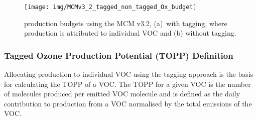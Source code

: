 \begin{figure}
    \centering
    \texttt{[image: img/MCMv3\_2\_tagged\_non\_tagged\_Ox\_budget]}
    \vspace{2mm}
    \caption{ production budgets using the MCM v3.2, \mbox{(a) with} tagging, where  production is attributed to individual VOC and (b) without tagging.}
    \vspace{-4mm}
    \label{f:Ox_budget}
\end{figure} 

\subsubsection{Tagged Ozone Production Potential (TOPP) Definition} %

Allocating  production to individual VOC using the tagging approach is the basis for calculating the TOPP of a VOC.
The TOPP for a given VOC is the number of  molecules produced per emitted VOC molecule and is defined as the daily contribution to  production from a VOC normalised by the total emissions of the VOC.
